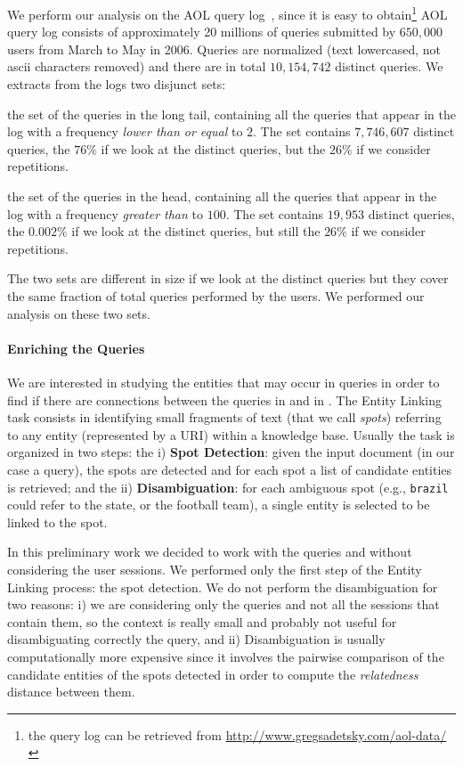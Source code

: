 We perform our analysis on the AOL query log~\cite{pass2006picture}, since it is easy to obtain\footnote{the query log can be retrieved from \url{http://www.gregsadetsky.com/aol-data/}}
AOL query log consists of approximately 20 millions of queries submitted by $650,000$ users from March to May in 2006. Queries are normalized (text lowercased, not ascii characters removed) and 
there are in total $10,154,742$ distinct queries. We extracts from the logs two disjunct sets: 
\begin{description}
	\item{\tail{}} the set of the queries in the long tail, containing all the queries that appear in the log with a frequency \emph{lower than or equal} to $2$. The set contains 
	$7,746,607$ distinct queries, the $76\%$ if we look at the distinct queries, but the $26\%$ if we consider repetitions. 
	\item{\head{}} the set of the queries in the head, containing all the queries that appear in the log with a frequency \emph{greater than} to $100$. The set contains 
	$19,953$ distinct queries, the $0.002\%$ if we look at the distinct queries, but still the $26\%$ if we consider repetitions.
\end{description}
The two sets are different in size if we look at the distinct queries but they cover the same fraction of total queries performed by the users. We performed our 
analysis on these two sets.

\paragraph{Enriching the Queries}
We are interested in studying the entities that may occur in queries in order to find if there are connections between the queries in \head{} and in \tail{}.
The Entity Linking task consists in identifying  small fragments of text (that we call \emph{spots}) referring to any entity (represented by a URI) 
within a knowledge base. Usually the task is organized in two steps: the i) \textbf{Spot Detection}: given the input document (in our case a query), 
the spots are detected and for each spot a list of candidate entities is retrieved; and the ii) \textbf{Disambiguation}:
for each ambiguous spot (e.g., \texttt{brazil} could refer to the state, or the football team), a single  entity is 
selected  to be linked to the spot.

In this preliminary work we decided to work with the queries and without considering the user sessions. We performed only the first step of the Entity Linking 
process: the spot detection. We do not perform the disambiguation for two reasons: i) we are considering only the queries and not all the sessions that contain 
them, so the context is really small and probably not useful for disambiguating correctly the query, and ii) Disambiguation is usually computationally more expensive
since it involves the pairwise comparison of the candidate entities of the spots
detected in order to compute the \emph{relatedness} distance between them.

